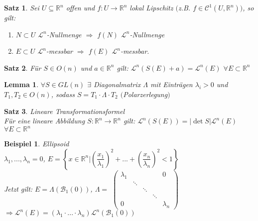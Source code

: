 \documentclass[11pt]{memoir}
\theoremstyle{changebreak}
\newtheorem{Beispiel}{Beispiel}[chapter]
\newtheorem{Lemma}{Lemma}[chapter]
\newtheorem{Satz}{Satz}[chapter]
\begin{document}
\newpage



\begin{Satz}
Sei $U \subseteq \mathbb R^n$ offen und $f: U \rightarrow \mathbb R^n$ lokal Lipschitz $($z.B. $f \in \mathscr C^1(U, \mathbb R^n))$, so gilt:
\begin{enumerate}
	\item $N \subset U$ $\mathscr L^n$-Nullmenge $\Rightarrow$ $f(N)$ $\mathscr L^n$-Nullmenge
	\item $E \subset U$ $\mathscr L^n$-messbar $\Rightarrow$ $f(E)$ $\mathscr L^n$-messbar.
\end{enumerate}
\end{Satz}


\begin{Satz}
Für $S \in O(n)$ und $a \in \mathbb R^n$ gilt:
$\mathscr L^n (S(E) +a) = \mathscr L^n(E)$ $\forall E \subset \mathbb R^n$
\end{Satz}


\begin{Lemma}
$\forall S \in GL(n)$ $\exists$ Diagonalmatrix $\Lambda$ mit Einträgen $\lambda_i > 0$ und $T_1, T_2 \in O(n)$, sodass $S = T_1\cdotp\Lambda\cdotp T_2$ $($Polarzerlegung$)$
\end{Lemma}


\begin{Satz}
\emph{Lineare Transformationsformel} \\
Für eine lineare Abbildung $S: \mathbb R^n \rightarrow \mathbb R^n$ gilt: $\mathscr L^n(S(E)) = |\det S| \mathscr L^n(E)$ $\forall E \subset \mathbb R^n$
\end{Satz}


\begin{Beispiel}
\emph{Ellipsoid} \\
$\lambda_1, ..., \lambda_n = 0$, $E = \left\{ x \in \mathbb R^n | \left( \dfrac{x_1}{\lambda_1} \right)^2 + ... + \left (\dfrac{x_n}{\lambda_n}\right)^2 < 1 \right\}$ \\
Jetzt gilt: $E = \Lambda(\mathscr B_1(0))$, $\Lambda =$
$\begin{pmatrix}
      \lambda_1 & 	 &	&	& 0 \\
      		 &  	\ddots \\
		 &	& \ddots \\
		 &	&	& \ddots \\
		 0 &	&	&	&	\lambda_n
\end{pmatrix}$
$\Rightarrow \mathscr L^n(E) = (\lambda_1 \cdotp ... \cdotp \lambda_n)\mathscr L^n(\mathscr B_1(0))$
\end{Beispiel}
\end{document}
